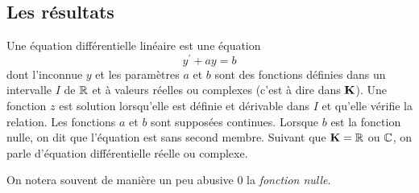 \subsection{Les résultats}
\begin{defi}
 Une équation différentielle linéaire est une équation
\begin{equation*}
 y^\prime +  a y = b
\end{equation*}
dont l'inconnue $y$ et les paramètres $a$ et $b$ sont des fonctions définies dans un intervalle $I$ de $\mathbb{R}$ et à valeurs réelles ou complexes (c'est à dire dans $\mathbf{K}$). Une fonction $z$ est solution lorsqu'elle est définie et dérivable dans $I$ et qu'elle vérifie la relation. Les fonctions $a$ et $b$ sont supposées continues. Lorsque $b$ est la fonction nulle, on dit que l'équation est sans second membre.\newline
Suivant que $\mathbf{K} = \mathbb{R}$ ou $\mathbb{C}$, on parle d'équation différentielle réelle ou complexe.
\end{defi}
\begin{rem}
 On notera souvent de manière un peu abusive $0$ la \emph{fonction nulle}.
\end{rem}

